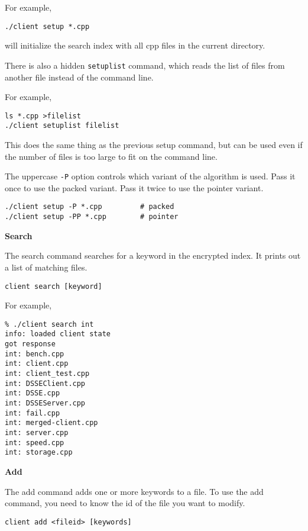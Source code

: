 For example,

\begin{lstlisting}
./client setup *.cpp
\end{lstlisting}

will initialize the search index with all cpp files in the current directory.

There is also a hidden \texttt{setuplist} command, which reads the list of files from another file
instead of the command line.

For example,

\begin{lstlisting}
ls *.cpp >filelist
./client setuplist filelist
\end{lstlisting}

This does the same thing as the previous setup command, but can be used even if
the number of files is too large to fit on the command line.

The uppercase \texttt{-P} option  controls which variant of the algorithm is used.
Pass it once to use the packed variant. Pass it twice to use the pointer variant.

\begin{lstlisting}
./client setup -P *.cpp         # packed
./client setup -PP *.cpp        # pointer
\end{lstlisting}

\noindent\textbf{Search}

The search command searches for a keyword in the encrypted index.
It prints out a list of matching files.

\begin{lstlisting}
client search [keyword]
\end{lstlisting}

For example,

\begin{lstlisting}
% ./client search int
info: loaded client state
got response
int: bench.cpp
int: client.cpp
int: client_test.cpp
int: DSSEClient.cpp
int: DSSE.cpp
int: DSSEServer.cpp
int: fail.cpp
int: merged-client.cpp
int: server.cpp
int: speed.cpp
int: storage.cpp
\end{lstlisting}

\noindent\textbf{Add}

The add command adds one or more keywords to a file.
To use the add command, you need to know the id of the file you want to modify.

\begin{lstlisting}
client add <fileid> [keywords]
\end{lstlisting}

